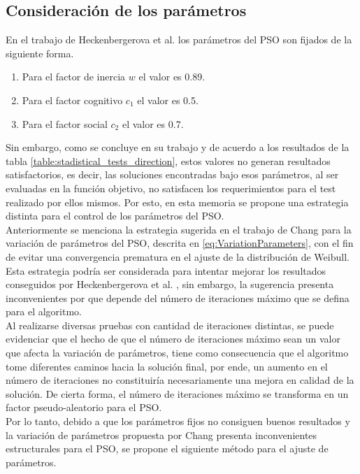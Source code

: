 \subsection{Consideración de los parámetros}\label{subsec:parametros_new}
En el trabajo de Heckenbergerova et al. \cite{Heckenbergerova15} los parámetros del PSO son fijados de la siguiente forma.
\begin{enumerate}
  \item Para el factor de inercia $w$ el valor es 0.89.
  \item Para el factor cognitivo $c_1$ el valor es 0.5.
  \item Para el factor social $c_2$ el valor es 0.7.
\end{enumerate}
Sin embargo, como se concluye en su trabajo y de acuerdo a los resultados de la tabla \ref{table:stadistical_tests_direction}, estos valores no generan resultados satisfactorios, es decir, las soluciones encontradas bajo esos parámetros, al ser evaluadas en la función objetivo, no satisfacen los requerimientos para el test realizado por ellos mismos. Por esto, en esta memoria se propone una estrategia distinta para el control de los parámetros del PSO.\\ 
Anteriormente se menciona la estrategia sugerida en el trabajo de Chang \cite{Chang10_2} para la variación de parámetros del PSO, descrita en \ref{eq:VariationParameters}, con el fin de evitar una convergencia prematura en el ajuste de la distribución de Weibull. Esta estrategia podría ser considerada para intentar mejorar los resultados conseguidos por Heckenbergerova et al. \cite{Heckenbergerova15}, sin embargo, la sugerencia presenta inconvenientes por que depende del número de iteraciones máximo que se defina para el algoritmo.\\
Al realizarse diversas pruebas con cantidad de iteraciones distintas, se puede evidenciar que el hecho de que el número de iteraciones máximo sean un valor que afecta la variación de parámetros, tiene como consecuencia que el algoritmo tome diferentes caminos hacia la solución final, por ende, un aumento en el número de iteraciones no constituiría necesariamente una mejora en calidad de la solución. De cierta forma, el número de iteraciones máximo se transforma en un factor pseudo-aleatorio para el PSO.\\
Por lo tanto, debido a que los parámetros fijos no consiguen buenos resultados y la variación de parámetros propuesta por Chang \cite{Chang10_2} presenta inconvenientes estructurales para el PSO, se propone el siguiente método para el ajuste de parámetros.\\
